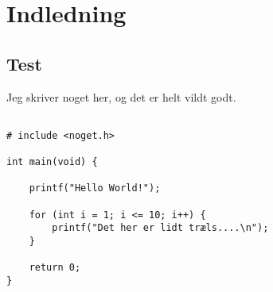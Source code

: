 \chapter{Indledning}\label{ch:introduction}
\section{Test}

Jeg skriver noget her, og det er helt vildt godt.

\begin{verbatim}

# include <noget.h>

int main(void) {
    
    printf("Hello World!");
    
    for (int i = 1; i <= 10; i++) {
        printf("Det her er lidt træls....\n");
    }
    
    return 0;
}
\end{verbatim}